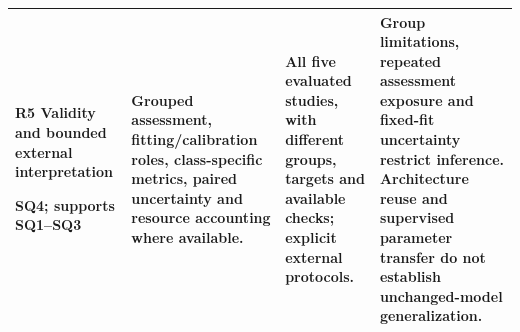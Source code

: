 \begin{tabularx}{\linewidth}{@{}>{\raggedright\arraybackslash}p{73bp}>{\raggedright\arraybackslash}p{111bp}>{\raggedright\arraybackslash}p{100bp}>{\raggedright\arraybackslash}X@{}}
\addlinespace[7bp]
\textbf{R5 Validity and bounded external interpretation}\par SQ4; supports SQ1--SQ3 &
Grouped assessment, fitting/calibration roles, class-specific metrics, paired uncertainty and resource accounting where available. &
All five evaluated studies, with different groups, targets and available checks; explicit external protocols. &
Group limitations, repeated assessment exposure and fixed-fit uncertainty restrict inference. Architecture reuse and supervised parameter transfer do not establish unchanged-model generalization. \\
\bottomrule
\end{tabularx}
\endgroup
